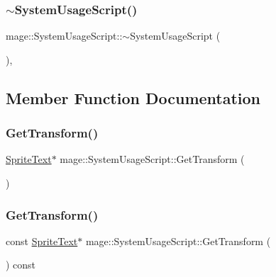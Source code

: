 \subsubsection{\texorpdfstring{$\sim$\+System\+Usage\+Script()}{~SystemUsageScript()}}
{\footnotesize\ttfamily mage\+::\+System\+Usage\+Script\+::$\sim$\+System\+Usage\+Script (\begin{DoxyParamCaption}{ }\end{DoxyParamCaption})\hspace{0.3cm}{\ttfamily [virtual]}, {\ttfamily [default]}}



\subsection{Member Function Documentation}
\hypertarget{classmage_1_1_system_usage_script_ad8291c309495bd06cd6878814bc422c9}{}\label{classmage_1_1_system_usage_script_ad8291c309495bd06cd6878814bc422c9} 
\subsubsection{\texorpdfstring{Get\+Transform()}{GetTransform()}\hspace{0.1cm}{\footnotesize\ttfamily [1/2]}}
{\footnotesize\ttfamily \hyperlink{classmage_1_1_sprite_text}{Sprite\+Text}$\ast$ mage\+::\+System\+Usage\+Script\+::\+Get\+Transform (\begin{DoxyParamCaption}{ }\end{DoxyParamCaption})}

\hypertarget{classmage_1_1_system_usage_script_ac6f33a63937537375821d7780859a83e}{}\label{classmage_1_1_system_usage_script_ac6f33a63937537375821d7780859a83e} 
\subsubsection{\texorpdfstring{Get\+Transform()}{GetTransform()}\hspace{0.1cm}{\footnotesize\ttfamily [2/2]}}
{\footnotesize\ttfamily const \hyperlink{classmage_1_1_sprite_text}{Sprite\+Text}$\ast$ mage\+::\+System\+Usage\+Script\+::\+Get\+Transform (\begin{DoxyParamCaption}{ }\end{DoxyParamCaption}) const}

